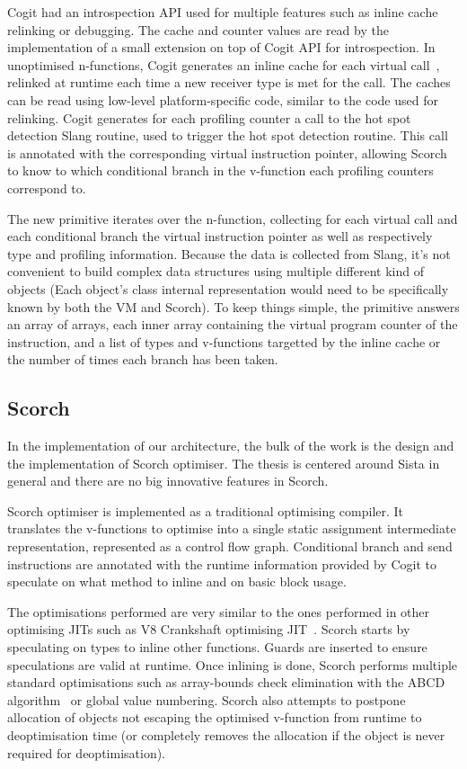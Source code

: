 \documentclass[a4paper,12pt,twoside]{../includes/ThesisStyle}
\begin{document}
Cogit had an introspection API used for multiple features such as inline cache relinking or debugging. The cache and counter values are read by the implementation of a small extension on top of Cogit API for introspection. In unoptimised n-functions, Cogit generates an inline cache for each virtual call~\cite{Deut84a,Holz91a}, relinked at runtime each time a new receiver type is met for the call. The caches can be read using low-level platform-specific code, similar to the code used for relinking. Cogit generates for each profiling counter a call to the hot spot detection Slang routine, used to trigger the hot spot detection routine. This call is annotated with the corresponding virtual instruction pointer, allowing Scorch to know to which conditional branch in the v-function each profiling counters correspond to.

The new primitive iterates over the n-function, collecting for each virtual call and each conditional branch the virtual instruction pointer as well as respectively type and profiling information. Because the data is collected from Slang, it's not convenient to build complex data structures using multiple different kind of objects (Each object's class internal representation would need to be specifically known by both the VM and Scorch). To keep things simple, the primitive answers an array of arrays, each inner array containing the virtual program counter of the instruction, and a list of types and v-functions targetted by the inline cache or the number of times each branch has been taken.

\subsection{Scorch}

In the implementation of our architecture, the bulk of the work is the design and the implementation of Scorch optimiser. The thesis is centered around Sista in general and there are no big innovative features in Scorch.

Scorch optimiser is implemented as a traditional optimising compiler. It translates the v-functions to optimise into a single static assignment intermediate representation, represented as a control flow graph. Conditional branch and send instructions are annotated with the runtime information provided by Cogit to speculate on what method to inline and on basic block usage.

The optimisations performed are very similar to the ones performed in other optimising JITs such as V8 Crankshaft optimising JIT~\cite{V8}. Scorch starts by speculating on types to inline other functions. Guards are inserted to ensure speculations are valid at runtime. Once inlining is done, Scorch performs multiple standard optimisations such as array-bounds check elimination with the ABCD algorithm~\cite{Bodi00a} or global value numbering. Scorch also attempts to postpone allocation of objects not escaping the optimised v-function from runtime to deoptimisation time (or completely removes the allocation if the object is never required for deoptimisation).
\end{document}
